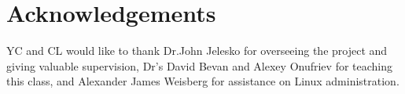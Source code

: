 \documentclass[11pt,letterpaper,twoside,english]{article}
\begin{document}
\section{Acknowledgements}

YC and CL would like to thank Dr.John Jelesko for overseeing the project
and giving valuable supervision, Dr's David Bevan and Alexey Onufriev
for teaching this class, and Alexander James Weisberg for assistance
on Linux administration.



\end{document}
